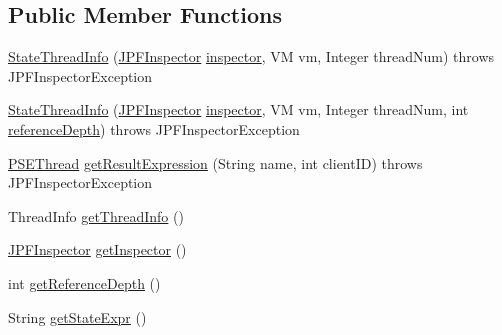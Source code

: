 \subsection*{Public Member Functions}
\begin{DoxyCompactItemize}
\item 
\hyperlink{classgov_1_1nasa_1_1jpf_1_1inspector_1_1server_1_1programstate_1_1_state_thread_info_a13cc5f0e9ac0b019eb67e6cf9c3bd805}{State\+Thread\+Info} (\hyperlink{classgov_1_1nasa_1_1jpf_1_1inspector_1_1server_1_1jpf_1_1_j_p_f_inspector}{J\+P\+F\+Inspector} \hyperlink{classgov_1_1nasa_1_1jpf_1_1inspector_1_1server_1_1programstate_1_1_state_node_a26561849632450a4deb53e38716d93c6}{inspector}, VM vm, Integer thread\+Num)  throws J\+P\+F\+Inspector\+Exception 
\item 
\hyperlink{classgov_1_1nasa_1_1jpf_1_1inspector_1_1server_1_1programstate_1_1_state_thread_info_a4e4a4d1f83d1ea1056af709864d21020}{State\+Thread\+Info} (\hyperlink{classgov_1_1nasa_1_1jpf_1_1inspector_1_1server_1_1jpf_1_1_j_p_f_inspector}{J\+P\+F\+Inspector} \hyperlink{classgov_1_1nasa_1_1jpf_1_1inspector_1_1server_1_1programstate_1_1_state_node_a26561849632450a4deb53e38716d93c6}{inspector}, VM vm, Integer thread\+Num, int \hyperlink{classgov_1_1nasa_1_1jpf_1_1inspector_1_1server_1_1programstate_1_1_state_node_a55683618625dae46e8aa68d95811d6bb}{reference\+Depth})  throws J\+P\+F\+Inspector\+Exception 
\item 
\hyperlink{classgov_1_1nasa_1_1jpf_1_1inspector_1_1common_1_1pse_1_1_p_s_e_thread}{P\+S\+E\+Thread} \hyperlink{classgov_1_1nasa_1_1jpf_1_1inspector_1_1server_1_1programstate_1_1_state_thread_info_ac968a68c7c78447ec4da5d94feca41e8}{get\+Result\+Expression} (String name, int client\+ID)  throws J\+P\+F\+Inspector\+Exception 
\item 
Thread\+Info \hyperlink{classgov_1_1nasa_1_1jpf_1_1inspector_1_1server_1_1programstate_1_1_state_thread_info_a0a3ff05201e93f0e662ae0d654f790f5}{get\+Thread\+Info} ()
\item 
\hyperlink{classgov_1_1nasa_1_1jpf_1_1inspector_1_1server_1_1jpf_1_1_j_p_f_inspector}{J\+P\+F\+Inspector} \hyperlink{classgov_1_1nasa_1_1jpf_1_1inspector_1_1server_1_1programstate_1_1_state_node_af07846313e0632df18008b5bf571f805}{get\+Inspector} ()
\item 
int \hyperlink{classgov_1_1nasa_1_1jpf_1_1inspector_1_1server_1_1programstate_1_1_state_node_af59b1ac0319251e657293c810a16cdd9}{get\+Reference\+Depth} ()
\item 
String \hyperlink{classgov_1_1nasa_1_1jpf_1_1inspector_1_1server_1_1programstate_1_1_state_node_a54c1c8d91f93c078171589f844252bdf}{get\+State\+Expr} ()
\end{DoxyCompactItemize}
